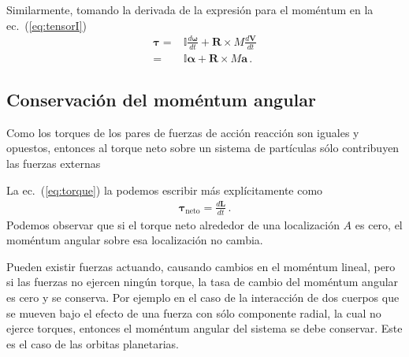 Similarmente, tomando la derivada de la expresión para el moméntum en la ec.~(\ref{eq:tensorI})
\begin{align}
  \boldsymbol{\tau}=&\mathbb{I}\frac{d\boldsymbol{\omega}}{dt}+\mathbf{R}\times M\frac{d\mathbf{V}}{dt}\nonumber\\
=&\mathbb{I}\boldsymbol{\alpha}+\mathbf{R}\times M\mathbf{a}\,.
\end{align}




\subsection{Conservación del moméntum angular}
Como los torques de los pares de fuerzas de acción reacción son iguales y opuestos, entonces al torque neto sobre un sistema de partículas sólo contribuyen las fuerzas externas

La ec.~(\ref{eq:torque}) la podemos escribir más explícitamente como
\begin{align}
  \label{eq:torqueneto}
  \boldsymbol{\tau}_{\text{neto}}=\frac{d\mathbf{L}}{dt}\,.
\end{align}
Podemos observar que si el torque neto alrededor de una localización
$A$ es cero, el moméntum angular sobre esa localización no cambia.

Pueden existir fuerzas actuando, causando cambios en el moméntum
lineal, pero si las fuerzas no ejercen ningún torque, la tasa de
cambio del moméntum angular es cero y se conserva. Por ejemplo en el
caso de la interacción de dos cuerpos que se mueven bajo el efecto de
una fuerza con sólo componente radial, la cual no ejerce torques,
entonces el moméntum angular del sistema se debe conservar. Este es el
caso de las orbitas planetarias.


